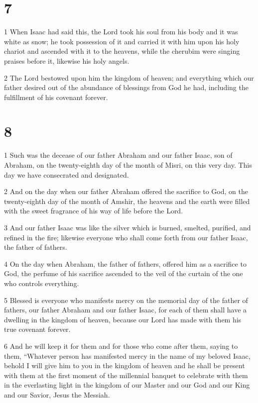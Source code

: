 \chapter{7}

\par 1 When Isaac had said this, the Lord took his soul from his body and it was white as snow; he took possession of it and carried it with him upon his holy chariot and ascended with it to the heavens, while the cherubim were singing praises before it, likewise his holy angels. 

\par 2 The Lord bestowed upon him the kingdom of heaven; and everything which our father desired out of the abundance of blessings from God he had, including the fulfillment of his covenant forever.

\chapter{8}

\par 1 Such was the decease of our father Abraham and our father Isaac, son of Abraham, on the twenty-eighth day of the month of Misri, on this very day. This day we have consecrated and designated. 

\par 2 And on the day when our father Abraham offered the sacrifice to God, on the twenty-eighth day of the month of Amshir, the heavens and the earth were filled with the sweet fragrance of his way of life before the Lord. 

\par 3 And our father Isaac was like the silver which is burned, smelted, purified, and refined in the fire; likewise everyone who shall come forth from our father Isaac, the father of fathers. 

\par 4 On the day when Abraham, the father of fathers, offered him as a sacrifice to God, the perfume of his sacrifice ascended to the veil of the curtain of the one who controls everything. 

\par 5 Blessed is everyone who manifests mercy on the memorial day of the father of fathers, our father Abraham and our father Isaac, for each of them shall have a dwelling in the kingdom of heaven, because our Lord has made with them his true covenant forever. 

\par 6 And he will keep it for them and for those who come after them, saying to them, “Whatever person has manifested mercy in the name of my beloved Isaac, behold I will give him to you in the kingdom of heaven and he shall be present with them at the first moment of the millennial banquet to celebrate with them in the everlasting light in the kingdom of our Master and our God and our King and our Savior, Jesus the Messiah. 

